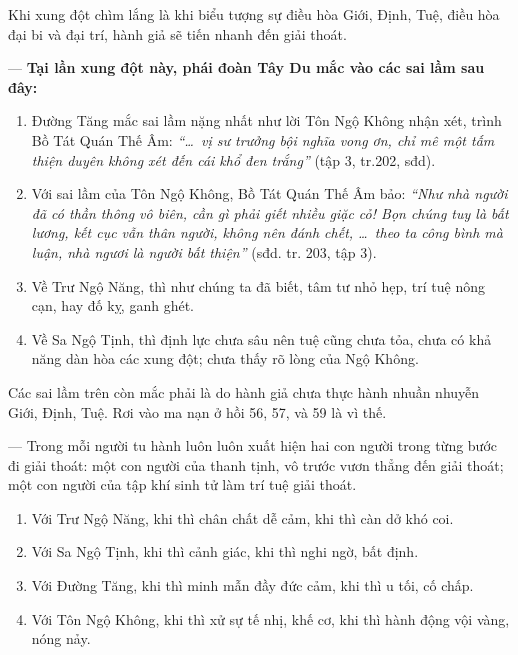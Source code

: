 Khi xung đột chìm lắng là khi biểu tượng sự điều hòa Giới, Định, Tuệ, điều hòa đại bi và đại trí, hành giả sẽ tiến nhanh đến giải thoát.

— {\bf Tại lần xung đột này, phái đoàn Tây Du mắc vào các sai lầm sau đây:}

\begin{enumerate}[label=\itshape\alph*\upshape/]
    \item Đường Tăng mắc sai lầm nặng nhất như lời Tôn Ngộ Không nhận xét, trình Bồ Tát Quán Thế Âm: \emph{``\ldots ~vị sư trưởng bội nghĩa vong ơn, chỉ mê một tấm thiện duyên không xét đến cái khổ đen trắng''} (tập 3, tr.202, sđd).

    \item Với sai lầm của Tôn Ngộ Không, Bồ Tát Quán Thế Âm bảo: \emph{``Như nhà người đã có thần thông vô biên, cần gì phải giết nhiều giặc cỏ! Bọn chúng tuy là bất lương, kết cục vẫn thân người, không nên đánh chết, \ldots ~theo ta công bình mà luận, nhà ngươi là người bất thiện''} (sđd. tr. 203, tập 3).

    \item Về Trư Ngộ Năng, thì như chúng ta đã biết, tâm tư nhỏ hẹp, trí tuệ nông cạn, hay đố kỵ, ganh ghét.

    \item Về Sa Ngộ Tịnh, thì định lực chưa sâu nên tuệ cũng chưa tỏa, chưa có khả năng dàn hòa các xung đột; chưa thấy rõ lòng của Ngộ Không.
\end{enumerate}

Các sai lầm trên còn mắc phải là do hành giả chưa thực hành nhuần nhuyễn Giới, Định, Tuệ. Rơi vào ma nạn ở hồi 56, 57, và 59 là vì thế.

— Trong mỗi người tu hành luôn luôn xuất hiện hai con người trong từng bước đi giải thoát: một con người của thanh tịnh, vô trước vươn thẳng đến giải thoát; một con người của tập khí sinh tử làm trí tuệ giải thoát.

\begin{enumerate}[label=\itshape\alph*\upshape/]
    \item Với Trư Ngộ Năng, khi thì chân chất dễ cảm, khi thì càn dở khó coi.

    \item Với Sa Ngộ Tịnh, khi thì cảnh giác, khi thì nghi ngờ, bất định.

    \item Với Đường Tăng, khi thì minh mẫn đầy đức cảm, khi thì u tối, cố chấp.

    \item Với Tôn Ngộ Không, khi thì xử sự tế nhị, khế cơ, khi thì hành động vội vàng, nóng nảy.
\end{enumerate}

